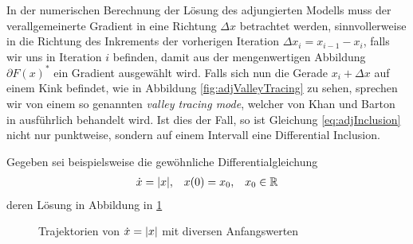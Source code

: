 In der numerischen Berechnung der Lösung des adjungierten Modells muss der verallgemeinerte Gradient in eine Richtung $\Delta x$ betrachtet werden, sinnvollerweise in die Richtung des Inkrements der vorherigen Iteration $\Delta x_i = x_{i-1} - x_i$, falls wir uns in Iteration $i$ befinden, damit aus der mengenwertigen Abbildung $ \partial F(x)^*$ ein Gradient ausgewählt wird. 
Falls sich nun die Gerade $x_i + \Delta x$ auf einem Kink befindet, wie in Abbildung \ref{fig:adjValleyTracing} zu sehen, sprechen wir von einem so genannten \textit{valley tracing mode}, welcher von Khan und Barton in \cite{khan2014} ausführlich behandelt wird. Ist dies der Fall, so ist Gleichung \eqref{eq:adjInclusion} nicht nur punktweise, sondern auf einem Intervall eine Differential Inclusion.

Gegeben sei beispielsweise die gewöhnliche Differentialgleichung
\begin{equation}\label{eq:babyEquation}
\begin{aligned}
 \dot{x} = |x|,&& x(0)=x_0,&& x_0\in\mathbb{R}
 \end{aligned}
\end{equation}
deren Lösung in Abbildung in \ref{fig:babyExampleSol}

\begin{figure}[H]
\footnotesize
\centering

\caption{Trajektorien von $\dot{x}=|x|$ mit diversen Anfangswerten}
\label{fig:babyExampleSol}
% 
% 
\end{figure}

